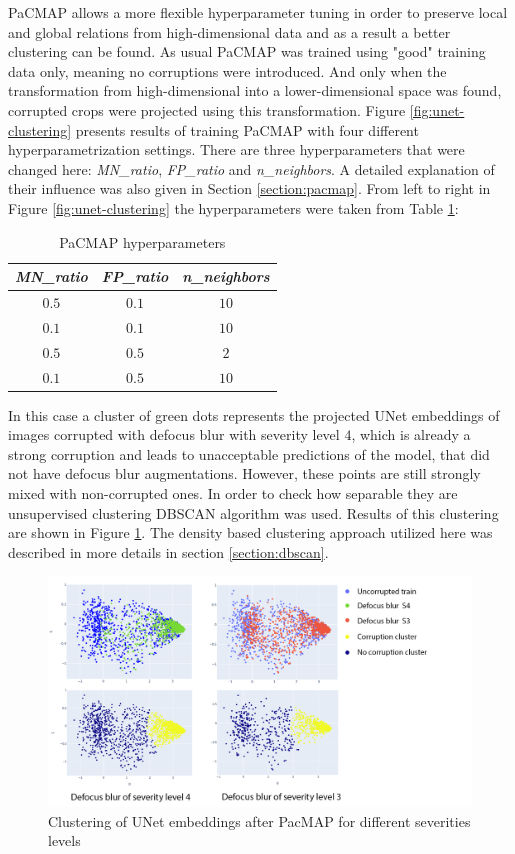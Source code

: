 PaCMAP allows a more flexible hyperparameter tuning in order to preserve local and global relations from high-dimensional data and as a result a better clustering can be found. As usual PaCMAP was trained using "good" training data only, meaning no corruptions were introduced. And only when the transformation from high-dimensional into a lower-dimensional space was found, corrupted crops were projected using this transformation. Figure \ref{fig:unet-clustering} presents results of training PaCMAP with four different hyperparametrization settings. There are three hyperparameters that were changed here: \textit{MN\_ratio}, \textit{FP\_ratio} and \textit{n\_neighbors}. A detailed explanation of their influence was also given in Section \ref{section:pacmap}. From left to right in Figure \ref{fig:unet-clustering} the hyperparameters were taken from Table \ref{table:pacmap-hyperparametrization}:

\begin{table}
	\centering
	\begin{tabularx}{\linewidth}{|ccc|}
		\hline
		\textit{MN\_ratio}
		&\textit{FP\_ratio}
		&\textit{n\_neighbors}
		\\\hline\hline
		$0.5$ & $0.1$ & $10$ \\\hline
		$0.1$ & $0.1$ & $10$\\\hline
		$0.5$ & $0.5$ & $2$\\\hline
		$0.1$ & $0.5$ & $10$\\\hline
	\end{tabularx}
	\caption[PaCMAP hyperparameters]%
	{PaCMAP hyperparameters}
	\label{table:pacmap-hyperparametrization}
\end{table}

In this case a cluster of green dots represents the projected UNet embeddings of images corrupted with defocus blur with severity level $4$, which is already a strong corruption and leads to unacceptable predictions of the model, that did not have defocus blur augmentations. However, these points are still strongly mixed with non-corrupted ones. In order to check how separable they are unsupervised clustering DBSCAN algorithm was used. Results of this clustering are shown in Figure \ref{fig:unet-clustering-sev-levels}. The density based clustering approach utilized here was described in more details in section \ref{section:dbscan}. 

\begin{figure}[htb]
	\begin{center}
		\includegraphics[width=0.6\linewidth]{bilder/unet-embeddings/db-levels.png}
		\caption{Clustering of UNet embeddings after PacMAP for different severities levels}
		\label{fig:unet-clustering-sev-levels}
	\end{center}
\end{figure}


